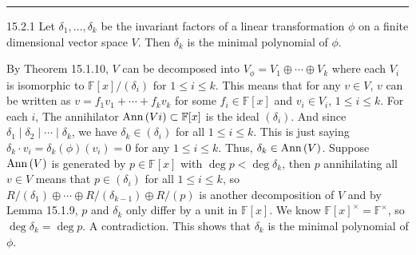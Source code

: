 \documentclass[a4paper, 12pt]{article}
\begin{document}
\noindent\rule{7in}{2.8pt}
\begin{problem}{15.2.1}
Let \(\delta_1,\ldots,\delta_k\) be the invariant factors of a linear transformation \(\phi\) on a finite dimensional vector space \(V\). Then \(\delta_k\) is the minimal polynomial 
of \(\phi\).
\end{problem}
\begin{solution}
By Theorem 15.1.10, \(V\) can be decomposed into \(V_\phi=V_1\oplus \cdots \oplus V_k\) where each \(V_i\) is isomorphic to \(\mathbb{F}[x]/(\delta_i)\) for \(1\leq i\leq k\). This means that for any \(v\in V\), \(v\) can be written as 
\(v=f_1v_1+\cdots +f_kv_k\) for some \(f_i\in \mathbb{F}[x]\) and \(v_i\in V_i\), \(1\leq i\leq k\). For each \(i\), The annihilator \(\text{Ann}\,(Vi)\subset \mathbb{F}[x]\) is the ideal \((\delta_i)\). And since \(\delta_1\mid \delta_2\mid \cdots\mid \delta_k\), we have 
\(\delta_k\in (\delta_i)\) for all \(1\leq i\leq k\). This is just saying \(\delta_k\cdot v_i=\delta_k(\phi)(v_i)=0\) for any \(1\leq i\leq k\). Thus, \(\delta_k\in \text{Ann}\,(V)\). Suppose \(\text{Ann}\,(V)\) is generated by \(p\in \mathbb{F}[x]\) with \(\deg p<\deg \delta_k\), then 
\(p\) annihilating all \(v\in V\) means that \(p\in (\delta_i)\) for all \(1\leq i\leq k\), so \(R/(\delta_1)\oplus \cdots \oplus R/(\delta_{k-1})\oplus R/(p)\) is another decomposition of \(V\) and by Lemma 15.1.9, \(p\) and \(\delta_k\) only differ by a unit in 
\(\mathbb{F}[x]\). We know \(\mathbb{F}[x]^{\times}=\mathbb{F}^{\times}\), so \(\deg \delta_k=\deg p\). A contradiction. This shows that \(\delta_k\) is the minimal polynomial of \(\phi\).
\end{solution}
\end{document}
